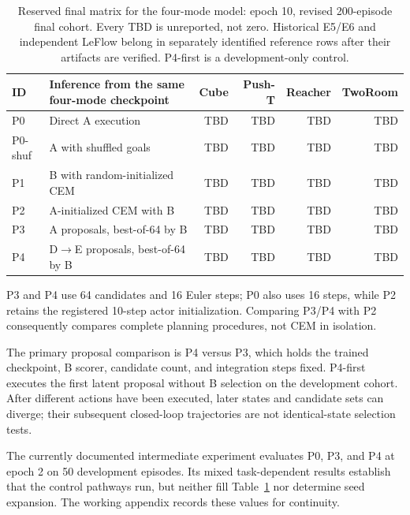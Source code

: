 \begin{table}[t]
 \centering
 \small
 \begin{tabular}{llrrrr}
  \toprule
  ID & Inference from the same four-mode checkpoint & Cube & Push-T & Reacher & TwoRoom \\
  \midrule
  P0 & Direct A execution & TBD & TBD & TBD & TBD \\
  P0-shuf & A with shuffled goals & TBD & TBD & TBD & TBD \\
  P1 & B with random-initialized CEM & TBD & TBD & TBD & TBD \\
  P2 & A-initialized CEM with B & TBD & TBD & TBD & TBD \\
  P3 & A proposals, best-of-64 by B & TBD & TBD & TBD & TBD \\
  P4 & D$\rightarrow$E proposals, best-of-64 by B & TBD & TBD & TBD & TBD \\
  \bottomrule
 \end{tabular}
 \caption{Reserved final matrix for the four-mode model: epoch 10, revised 200-episode final cohort. Every TBD is unreported, not zero. Historical E5/E6 and independent LeFlow belong in separately identified reference rows after their artifacts are verified. P4-first is a development-only control.}
 \label{tab:fourmode}
\end{table}

P3 and P4 use 64 candidates and 16 Euler steps; P0 also uses 16 steps, while P2 retains the registered 10-step actor initialization. Comparing P3/P4 with P2 consequently compares complete planning procedures, not CEM in isolation.

The primary proposal comparison is P4 versus P3, which holds the trained checkpoint, B scorer, candidate count, and integration steps fixed. P4-first executes the first latent proposal without B selection on the development cohort. After different actions have been executed, later states and candidate sets can diverge; their subsequent closed-loop trajectories are not identical-state selection tests.

The currently documented intermediate experiment evaluates P0, P3, and P4 at epoch 2 on 50 development episodes. Its mixed task-dependent results establish that the control pathways run, but neither fill Table~\ref{tab:fourmode} nor determine seed expansion. The working appendix records these values for continuity.

